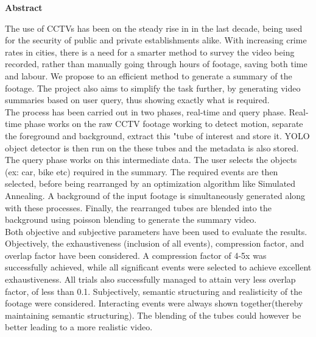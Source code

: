 \begin{center}
	\huge\bfseries Abstract

	\bigskip
	\normalsize

	\justify
	The use of CCTVs has been on the steady rise in in the last decade, being used for the security of public and private establishments alike. With increasing crime rates in cities, there is a need for a smarter method to survey the video being recorded, rather than manually going through hours of footage, saving both time and labour. We propose to an efficient method to generate a summary of the footage. The project also aims to simplify the task further, by generating video summaries based on user query, thus showing exactly what is required. \\

	The process has been carried out in two phases, real-time and query phase. Real-time phase works on the raw CCTV footage working to detect motion, separate the foreground and background, extract this "tube of interest and store it. YOLO object detector is then run on the these tubes and the metadata is also stored. The query phase works on this intermediate data. The user selects the objects (ex: car, bike etc)  required in the summary. The required events are then selected, before being rearranged by an optimization algorithm like Simulated Annealing. A background of the input footage is simultaneously generated along with these processes. Finally, the rearranged tubes are blended into the background using poisson blending to generate the summary video. \\

	Both objective and subjective parameters have been used to evaluate the results. Objectively, the exhaustiveness (inclusion of all events), compression factor, and overlap factor have been considered. A compression factor of 4-5x was successfully achieved, while all significant events were selected to achieve excellent exhaustiveness. All trials also successfully managed to attain very less overlap factor, of less than 0.1. Subjectively, semantic structuring and realisticity of the footage were considered. Interacting events were always shown together(thereby maintaining semantic structuring). The blending of the tubes could however be better leading to a more realistic video.

\end{center}

\bigskip



\pagebreak

\cleardoublepage

\tableofcontents
\listoffigures
\listoftables

\cleardoublepage